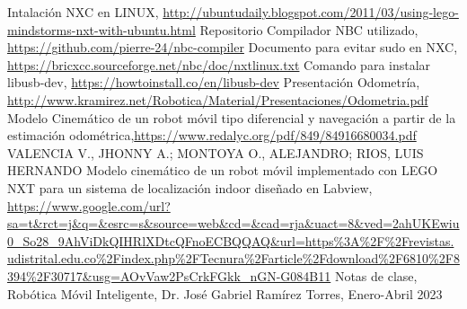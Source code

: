 \documentclass[oneside,onecolumn]{article}
\begin{document}
\begin{thebibliography}{0} %
 Intalación NXC en LINUX, \url{http://ubuntudaily.blogspot.com/2011/03/using-lego-mindstorms-nxt-with-ubuntu.html}
 Repositorio Compilador NBC utilizado, \url{https://github.com/pierre-24/nbc-compiler}
 Documento para evitar sudo en NXC, \url{https://bricxcc.sourceforge.net/nbc/doc/nxtlinux.txt}
 Comando para instalar libusb-dev, \url{https://howtoinstall.co/en/libusb-dev}
 Presentación Odometría, \url{http://www.kramirez.net/Robotica/Material/Presentaciones/Odometria.pdf}
 Modelo Cinemático de un robot móvil tipo diferencial y navegación a partir de la estimación odométrica,\url{https://www.redalyc.org/pdf/849/84916680034.pdf} VALENCIA V., JHONNY A.; MONTOYA O., ALEJANDRO; RIOS, LUIS HERNANDO
 Modelo cinemático de un robot móvil implementado con LEGO NXT para un sistema de localización indoor diseñado en Labview, \url{https://www.google.com/url?sa=t&rct=j&q=&esrc=s&source=web&cd=&cad=rja&uact=8&ved=2ahUKEwiu0_So28_9AhViDkQIHRlXDtcQFnoECBQQAQ&url=https%3A%2F%2Frevistas.udistrital.edu.co%2Findex.php%2FTecnura%2Farticle%2Fdownload%2F6810%2F8394%2F30717&usg=AOvVaw2PsCrkFGkk_nGN-G084B11}
 Notas de clase, Robótica Móvil Inteligente, Dr. José Gabriel Ramírez Torres, Enero-Abril 2023
\end{thebibliography}

\end{document}
